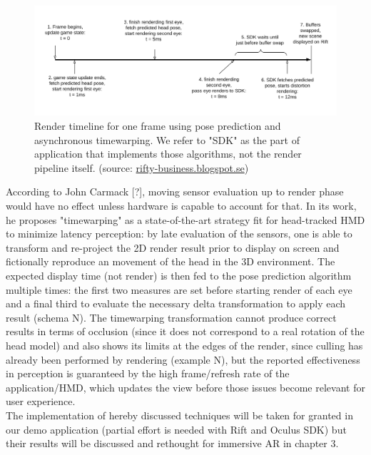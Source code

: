 \begin{figure}
\centering
\includegraphics[width=\linewidth]{schemas/timewarp-timeline}
\caption{Render timeline for one frame using pose prediction and asynchronous timewarping. We refer to "SDK" as the part of application that implements those algorithms, not the render pipeline itself. (source: \href{http://rifty-business.blogspot.se/2014/08/using-timewarp-on-oculus-rift.html}{rifty-business.blogspot.se})}
\label{fig:timewarp_timeline}
\end{figure}

According to John Carmack [?], moving sensor evaluation up to render phase would have no effect unless hardware is capable to account for that. In its work, he proposes "timewarping" as a state-of-the-art strategy fit for head-tracked HMD to minimize latency perception: by late evaluation of the sensors, one is able to transform and re-project the 2D render result prior to display on screen and fictionally reproduce an movement of the head in the 3D environment. The expected display time (not render) is then fed to the pose prediction algorithm multiple times: the first two measures are set before starting render of each eye and a final third to evaluate the necessary delta transformation to apply each result (schema N). The timewarping transformation cannot produce correct results in terms of occlusion (since it does not correspond to a real rotation of the head model) and also shows its limits at the edges of the render, since culling has already been performed by rendering (example N), but the reported effectiveness in perception is guaranteed by the high frame/refresh rate of the application/HMD, which updates the view before those issues become relevant for user experience.\\
The implementation of hereby discussed techniques will be taken for granted in our demo application (partial effort is needed with Rift and Oculus SDK) but their results will be discussed and rethought for immersive AR in chapter 3.

